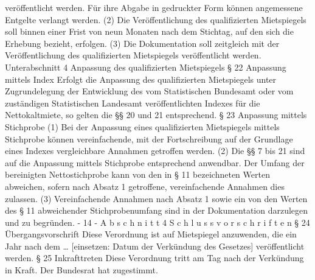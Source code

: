 veröffentlicht werden. Für ihre Abgabe in gedruckter Form können angemessene Entgelte
verlangt werden.
(2) Die Veröffentlichung des qualifizierten Mietspiegels soll binnen einer Frist von
neun Monaten nach dem Stichtag, auf den sich die Erhebung bezieht, erfolgen.
(3) Die Dokumentation soll zeitgleich mit der Veröffentlichung des qualifizierten Mietspiegels veröffentlicht werden.
Unterabschnitt 4
Anpassung des qualifizierten Mietspiegels
§ 22
Anpassung mittels Index
Erfolgt die Anpassung des qualifizierten Mietspiegels unter Zugrundelegung der Entwicklung des vom Statistischen Bundesamt oder vom zuständigen Statistischen Landesamt
veröffentlichten Indexes für die Nettokaltmiete, so gelten die §§ 20 und 21 entsprechend.
§ 23
Anpassung mittels Stichprobe
(1) Bei der Anpassung eines qualifizierten Mietspiegels mittels Stichprobe können vereinfachende, mit der Fortschreibung auf der Grundlage eines Indexes vergleichbare Annahmen getroffen werden.
(2) Die §§ 7 bis 21 sind auf die Anpassung mittels Stichprobe entsprechend anwendbar. Der Umfang der bereinigten Nettostichprobe kann von den in § 11 bezeichneten Werten abweichen, sofern nach Absatz 1 getroffene, vereinfachende Annahmen dies zulassen.
(3) Vereinfachende Annahmen nach Absatz 1 sowie ein von den Werten des § 11 abweichender Stichprobenumfang sind in der Dokumentation darzulegen und zu begründen.
- 14 -
A b s c h n i t t 4
S c h l u s s v o r s c h r i f t e n
§ 24
Übergangsvorschrift
Diese Verordnung ist auf Mietspiegel anzuwenden, die ein Jahr nach dem … [einsetzen: Datum der Verkündung des Gesetzes] veröffentlicht werden.
§ 25
Inkrafttreten
Diese Verordnung tritt am Tag nach der Verkündung in Kraft.
Der Bundesrat hat zugestimmt.